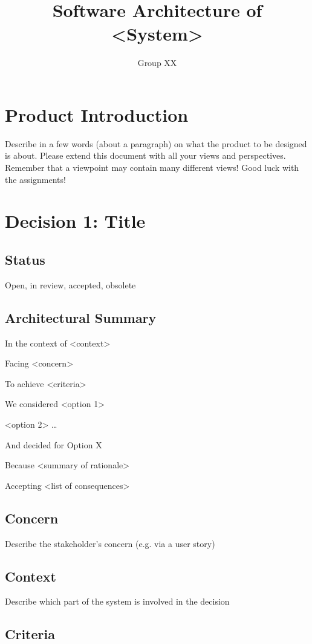 \documentclass{article}
\title{Software Architecture of \textless{}System\textgreater{}}
\author{Group XX}
\date{}
\begin{document}
\maketitle
\newpage

\section*{Product Introduction}
Describe in a few words (about a paragraph) on what the product to be designed is about. Please extend this document with all your views and perspectives. Remember that a viewpoint may contain many different views! Good luck with the assignments!

\section*{Decision 1: Title}
\subsection*{Status}
Open, in review, accepted, obsolete

\subsection*{Architectural Summary}
In the context of \textless{}context\textgreater{}

Facing \textless{}concern\textgreater{}

To achieve \textless{}criteria\textgreater{}

We considered \textless{}option 1\textgreater{}

\textless{}option 2\textgreater{} \ldots

And decided for Option X

Because \textless{}summary of rationale\textgreater{}

Accepting \textless{}list of consequences\textgreater{}

\subsection*{Concern}
Describe the stakeholder’s concern (e.g. via a user story)

\subsection*{Context}
Describe which part of the system is involved in the decision

\subsection*{Criteria}
\end{document}
